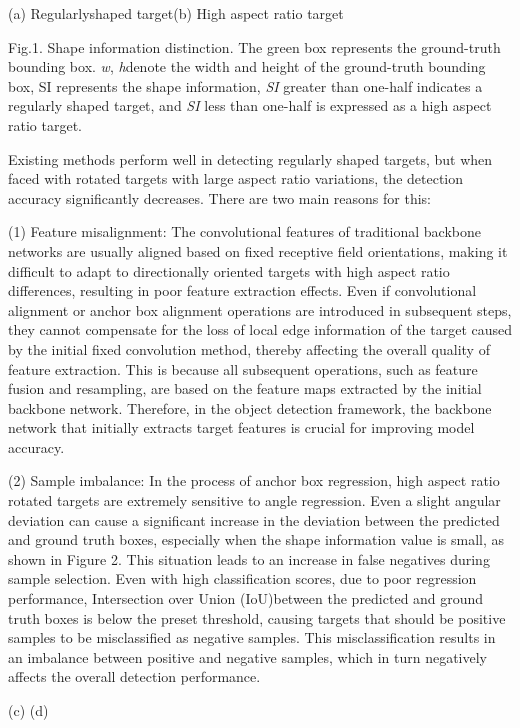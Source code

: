 \documentclass[10pt,twocolumn,final]{article}
\begin{document}
(a) Regularlyshaped target(b) High aspect ratio target

Fig.1. Shape information distinction. The green box represents the ground-truth bounding box. \textit{w}, \textit{h}denote the width and height of the ground-truth bounding box, SI represents the shape information, \textit{SI} greater than one-half indicates a regularly shaped target, and\textit{ SI} less than one-half is expressed as a high aspect ratio target.

Existing methods perform well in detecting regularly shaped targets, but when faced with rotated targets with large aspect ratio variations, the detection accuracy significantly decreases. There are two main reasons for this:

(1) Feature misalignment: The convolutional features of traditional backbone networks are usually aligned based on fixed receptive field orientations, making it difficult to adapt to directionally oriented targets with high aspect ratio differences, resulting in poor feature extraction effects. Even if convolutional alignment or anchor box alignment operations are introduced in subsequent steps, they cannot compensate for the loss of local edge information of the target caused by the initial fixed convolution method, thereby affecting the overall quality of feature extraction. This is because all subsequent operations, such as feature fusion and resampling, are based on the feature maps extracted by the initial backbone network. Therefore, in the object detection framework, the backbone network that initially extracts target features is crucial for improving model accuracy.

(2) Sample imbalance: In the process of anchor box regression, high aspect ratio rotated targets are extremely sensitive to angle regression. Even a slight angular deviation can cause a significant increase in the deviation between the predicted and ground truth boxes, especially when the shape information value is small, as shown in Figure 2. This situation leads to an increase in false negatives during sample selection. Even with high classification scores, due to poor regression performance, Intersection over Union (IoU)between the predicted and ground truth boxes is below the preset threshold, causing targets that should be positive samples to be misclassified as negative samples. This misclassification results in an imbalance between positive and negative samples, which in turn negatively affects the overall detection performance.

(c)                            (d)
\end{document}
